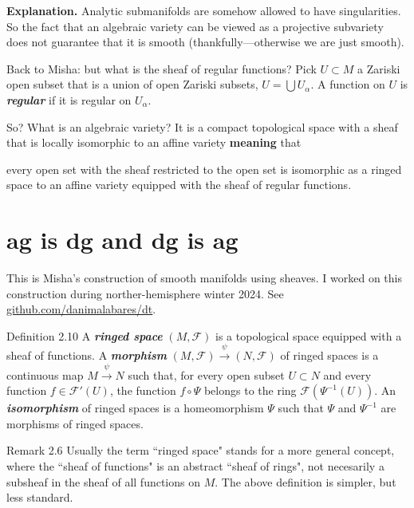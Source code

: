 \textbf{Explanation.} Analytic submanifolds are somehow allowed to have singularities. So the fact that an algebraic variety can be viewed as a projective subvariety does not guarantee that it is smooth (thankfully---otherwise we are just smooth).



Back to Misha: but what is the sheaf of regular functions? Pick \(U \subset M\) a Zariski open subset that is a union of open Zariski subsets, \(U=\bigcup U_\alpha\). A function on \(U\) is \textit{\textbf{regular}} if it is regular on \(U_\alpha\).

So? What is an algebraic variety? It is a compact topological space with a sheaf that is locally isomorphic to an affine variety \textbf{meaning} that 

\begin{tcolorbox}[colback=white,colframe=black,boxrule=0.5pt,sharp corners]
every open set with the sheaf restricted to the open set is isomorphic as a ringed space to an affine variety equipped with the sheaf of regular functions.
\end{tcolorbox}

\section{ag is dg and dg is ag}

This is Misha's construction of smooth manifolds using sheaves. I worked on this construction during norther-hemisphere winter 2024. See \href{https://github.com/danimalabares/dt}{github.com/danimalabares/dt}.

\begin{thing3}{Definition 2.10}\leavevmode
	A \textit{\textbf{ringed space}} $(M,\mathcal{F})$ is a topological space equipped with a sheaf of functions. A \textit{\textbf{morphism}} $(M,\mathcal{F}) \xrightarrow{\psi}(N,\mathcal{F})$ of ringed spaces is a continuous map $M \xrightarrow{\psi}N$ such that, for every open subset $U \subset N$ and every function $f \in \mathcal{F}'(U)$, the function $f \circ \Psi$ belongs to the ring $\mathcal{F}(\Psi^{-1}(U))$. An \textit{\textbf{isomorphism}} of ringed spaces is a homeomorphism $\Psi$ such that $\Psi$ and $\Psi^{-1}$ are morphisms of ringed spaces.
\end{thing3}

\begin{thing5}{Remark 2.6}\leavevmode
	Usually the term ``ringed space" stands for a more general concept, where the ``sheaf of functions" is an abstract ``sheaf of rings", not necesarily a subsheaf in the sheaf of all functions on  $M$. The above definition is simpler, but less standard.
\end{thing5}

